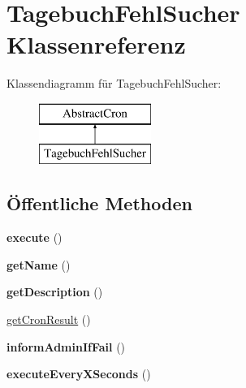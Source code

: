 \hypertarget{class_tagebuch_fehl_sucher}{}\section{Tagebuch\+Fehl\+Sucher Klassenreferenz}
\label{class_tagebuch_fehl_sucher}
Klassendiagramm für Tagebuch\+Fehl\+Sucher\+:\begin{figure}[H]
\begin{center}
\leavevmode
\includegraphics[height=2.000000cm]{class_tagebuch_fehl_sucher}
\end{center}
\end{figure}
\subsection*{Öffentliche Methoden}
\begin{DoxyCompactItemize}
\item 
\mbox{\label{class_tagebuch_fehl_sucher_ac815b77ba18962efb7a1427176dffcff}} 
{\bfseries execute} ()
\item 
\mbox{\label{class_tagebuch_fehl_sucher_a713796918ff62299ab433fa761657c5f}} 
{\bfseries get\+Name} ()
\item 
\mbox{\label{class_tagebuch_fehl_sucher_ac5c247807b0f8b3f3e177cdc616c6069}} 
{\bfseries get\+Description} ()
\item 
\mbox{\hyperlink{class_tagebuch_fehl_sucher_a0169a614fa033ff6376e424f9116b0fb}{get\+Cron\+Result}} ()
\item 
\mbox{\label{class_tagebuch_fehl_sucher_a2b5ceb3ddfc6e87def51a10664f62195}} 
{\bfseries inform\+Admin\+If\+Fail} ()
\item 
\mbox{\label{class_tagebuch_fehl_sucher_a017a57af472035ce2d7a523a0c3b2659}} 
{\bfseries execute\+Every\+X\+Seconds} ()
\end{DoxyCompactItemize}


